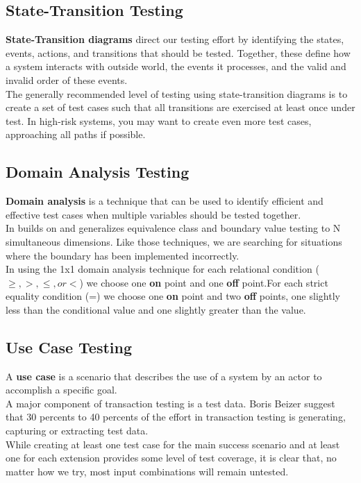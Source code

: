 \documentclass{article}
\begin{document}
\subsection*{State-Transition Testing}
\textbf{State-Transition diagrams} direct our testing effort by identifying the states, events, actions, and transitions that should be tested. Together, these define how a system interacts with outside world, the events it processes, and the valid and invalid order of these events.
\\
The generally recommended level of testing using state-transition diagrams is to create a set of test cases such that all transitions are exercised at least once under test. In high-risk systems, you may want to create even more test cases, approaching all paths if possible.

\subsection*{Domain Analysis Testing}
\textbf{Domain analysis} is a technique that can be used to identify efficient and effective test cases when multiple variables should be tested together.
\\
In builds on and generalizes equivalence class and boundary value testing to N simultaneous dimensions. Like those techniques, we are searching for situations where the boundary has been implemented incorrectly.
\\
In using the 1x1 domain analysis technique for each relational condition ($\geq, >, \leq, or <$) we choose one \textbf{on} point and one \textbf{off} point.For each strict equality condition (=) we choose one \textbf{on} point and two \textbf{off} points, one slightly less than the conditional value and one slightly greater than the value.

\subsection*{Use Case Testing}
A \textbf{use case} is a scenario that describes the use of a system by an actor to accomplish a specific goal.
\\
A major component of transaction testing is a test data. Boris Beizer suggest that 30 percents to 40 percents of the effort in transaction testing is generating, capturing or extracting test data.
\\
While creating at least one test case for the main success scenario and at least one for each extension provides some level of test coverage, it is clear that, no matter how we try, most input combinations will remain untested.
\end{document}
